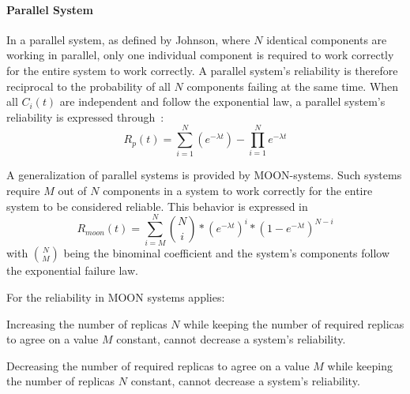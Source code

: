 \paragraph{Parallel System}
In a parallel system, as defined by Johnson, where $N$ identical components are working in parallel, only one individual component is required to work correctly for the entire system to work correctly.
A parallel system's reliability is therefore reciprocal to the probability of all $N$ components failing at the same time.
%
When all $C_i(t)$ are independent and follow the exponential law, a parallel system's reliability is expressed through~\cite{BarryFaultToleranceAnalysis}:
\begin{equation}
R_p(t) = \sum_{i = 1}^N ( e^{-\lambda t} ) - \prod_{i = 1}^N e^{-\lambda t}
\label{eq:combReliabParallel}
\end{equation}

A generalization of parallel systems is provided by \gls{MOON}-systems.
Such systems require $M$ out of $N$ components in a system to work correctly for the entire system to be considered reliable.
This behavior is expressed in
\begin{equation}
R_{moon}(t) = \sum_{i = M}^N {N \choose i} * (e^{-\lambda t})^i * (1 - e^{-\lambda t})^{N - i}
\label{eq:reliabilityMOON}
\end{equation}
with ${N \choose M}$ being the binominal coefficient and the system's components follow the exponential failure law.

For the reliability in \gls*{MOON} systems applies:

\begin{hypothesis}
Increasing the number of replicas $N$ while keeping the number of required replicas to agree on a value $M$ constant, cannot decrease a system's reliability.
\label{hyp:NIncreaseMConstant}
\end{hypothesis}

\begin{hypothesis}
Decreasing the number of required replicas to agree on a value $M$ while keeping the number of replicas $N$ constant, cannot decrease a system's reliability.
\label{hyp:MDecreaseNConstant}
\end{hypothesis}

